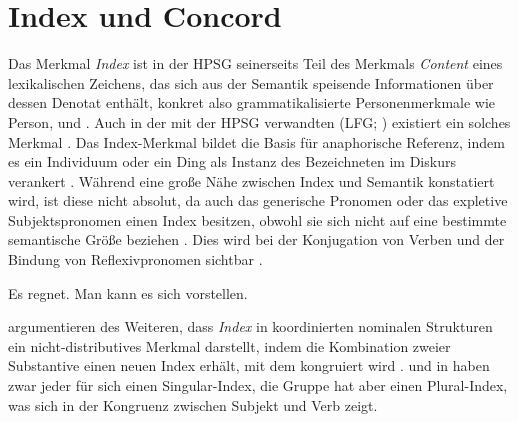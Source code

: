 

\section{Index und Concord}
\label{sec:indexconcord}

\label{phsec:index}

Das Merkmal \emph{Index} ist in der HPSG seinerseits Teil des Merkmals \emph{Content} eines lexikalischen
Zeichens, das sich aus der Semantik speisende Informationen über dessen Denotat
enthält, konkret also grammatikalisierte
Personen\-merkmale wie Person,  und
 \autocite[15--17]{wechslerzlatic2003}. Auch in der mit der
HPSG verwandten  (LFG; \cites{kaplanbresnan1982}{bresnan2001}{bresnanetal2016})
existiert ein solches Merkmal \autocite[189--190]{bresnanetal2016}. Das
Index-Merkmal bildet die Basis für anaphorische Referenz, indem es
ein Individuum oder ein Ding als Instanz des Bezeichneten im Diskurs
verankert \autocite[10--11]{wechslerzlatic2003}. Während eine
große Nähe zwischen Index und Semantik konstatiert wird, ist diese nicht
absolut, da auch das generische Pronomen  oder
das expletive Subjektspronomen  einen Index besitzen, obwohl sie sich
nicht auf eine bestimmte semantische Größe beziehen
\autocite[11--13]{wechslerzlatic2003}. Dies wird bei der Konjugation von Verben
und der Bindung von Reflexivpronomen sichtbar
.

\begin{exe}
\ex \label{ex:explvbkonj}
	\begin{xlist}
	\ex Es regnet.
	\ex Man kann es sich vorstellen.
	\end{xlist}
\end{exe}

\citet{kingdalrymple2004} argumentieren des Weiteren, dass \emph{Index} in
koordinierten nominalen Strukturen ein nicht-distributives
Merkmal darstellt, indem die Kombination zweier Substantive
einen neuen Index erhält, mit dem kongruiert wird
\autocite[74--76]{kingdalrymple2004}.  und  in
 haben zwar jeder für sich einen Singular-Index, die Gruppe
 hat aber einen Plural-Index, was sich in der Kongruenz
zwischen Subjekt und Verb zeigt.


